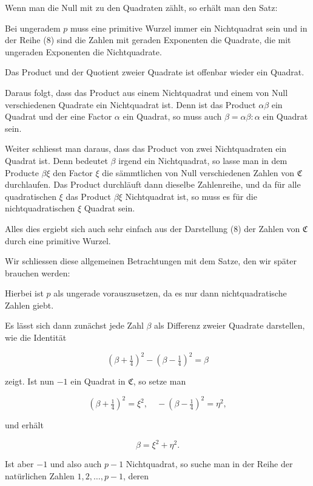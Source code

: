 Wenn man die Null mit zu den Quadraten zählt, so erhält man den Satz:


Bei ungeradem $p$ muss eine primitive Wurzel immer ein Nichtquadrat sein und in der Reihe (8) sind die Zahlen mit geraden Exponenten die Quadrate, die mit ungeraden Exponenten die Nichtquadrate.

Das Product und der Quotient zweier Quadrate ist offenbar wieder ein Quadrat.

Daraus folgt, dass das Product aus einem Nichtquadrat und einem von Null verschiedenen Quadrate ein Nichtquadrat ist. Denn ist das Product $\alpha\beta$ ein Quadrat und der eine Factor $\alpha$ ein Quadrat, so muss auch $\beta = \alpha\beta : \alpha$ ein Quadrat sein.

Weiter schliesst man daraus, dass das Product von zwei Nichtquadraten ein Quadrat ist. Denn bedeutet $\beta$ irgend ein Nichtquadrat, so lasse man in dem Producte $\beta\xi$ den Factor $\xi$ die sämmtlichen von Null verschiedenen Zahlen von $\mathfrak{C}$ durchlaufen. Das Product durchläuft dann dieselbe Zahlenreihe, und da für alle quadratischen $\xi$ das Product $\beta\xi$ Nichtquadrat ist, so muss es für die nichtquadratischen $\xi$ Quadrat sein.

Alles dies ergiebt sich auch sehr einfach aus der Darstellung (8) der Zahlen von $\mathfrak{C}$ durch eine primitive Wurzel.

Wir schliessen diese allgemeinen Betrachtungen mit dem Satze, den wir später brauchen werden:


Hierbei ist $p$ als ungerade vorauszusetzen, da es nur dann nichtquadratische Zahlen giebt.

Es lässt sich dann zunächst jede Zahl $\beta$ als Differenz zweier Quadrate darstellen, wie die Identität

\[
\left(\beta + \tfrac{1}{4}\right)^2 - \left(\beta - \tfrac{1}{4}\right)^2 = \beta
\]

zeigt. Ist nun $-1$ ein Quadrat in $\mathfrak{C}$, so setze man

\[
\left(\beta + \tfrac{1}{4}\right)^2 = \xi^2, \quad -\left(\beta - \tfrac{1}{4}\right)^2 = \eta^2,
\]

und erhält

\[
\beta = \xi^2 + \eta^2.
\]

Ist aber $-1$ und also auch $p - 1$ Nichtquadrat, so suche man in der Reihe der natürlichen Zahlen $1, 2, \ldots, p - 1$, deren
